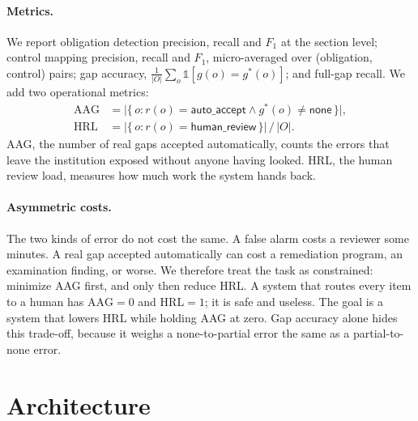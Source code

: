 \documentclass[sigconf,review,anonymous]{acmart}
\newcommand{\gapnone}{\textsf{none}}
\newcommand{\gappartial}{\textsf{partial}}
\begin{document}
\paragraph{Metrics.}
We report obligation detection precision, recall and $F_1$ at the section
level; control mapping precision, recall and $F_1$, micro-averaged over
(obligation, control) pairs; gap accuracy,
$\frac{1}{|O|}\sum_o \mathbb{1}[g(o) = g^*(o)]$; and full-gap recall. We add
two operational metrics:
\begin{align}
  \mathrm{AAG} &= \bigl|\{\, o : r(o) = \textsf{auto\_accept} \wedge g^*(o) \neq \gapnone \,\}\bigr|, \\
  \mathrm{HRL} &= \bigl|\{\, o : r(o) = \textsf{human\_review} \,\}\bigr| \,/\, |O| .
\end{align}
AAG, the number of real gaps accepted automatically, counts the errors that
leave the institution exposed without anyone having looked. HRL, the human
review load, measures how much work the system hands back.

\paragraph{Asymmetric costs.}
The two kinds of error do not cost the same. A false alarm costs a reviewer
some minutes. A real gap accepted automatically can cost a remediation
program, an examination finding, or worse. We therefore treat the task as
constrained: minimize AAG first, and only then reduce HRL. A system that
routes every item to a human has $\mathrm{AAG} = 0$ and $\mathrm{HRL} = 1$;
it is safe and useless. The goal is a system that lowers HRL while holding
AAG at zero. Gap accuracy alone hides this trade-off, because it weighs a
\gapnone{}-to-\gappartial{} error the same as a \gappartial{}-to-\gapnone{}
error.

\section{Architecture}
\label{sec:arch}
\end{document}
